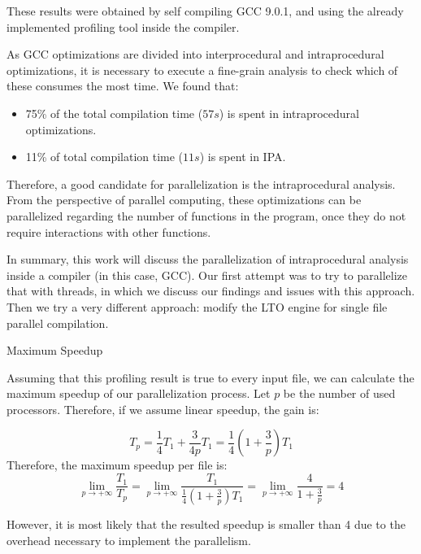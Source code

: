 These results were obtained by self compiling GCC 9.0.1, and using the already
implemented profiling tool inside the compiler.

As GCC optimizations are divided into interprocedural and intraprocedural
optimizations, it is necessary to execute a fine-grain analysis to check which
of these consumes the most time. We found that:
\begin{itemize}
	\item 75\% of the total compilation time ($57s$) is spent in intraprocedural
	optimizations.

	\item 11\% of total compilation time ($11s$) is spent in IPA.
\end{itemize}

Therefore, a good candidate for parallelization is the intraprocedural
analysis. From the perspective of parallel computing, these optimizations can
be parallelized regarding the number of functions in the program, once they do
not require interactions with other functions. 

In summary, this work will discuss the parallelization of intraprocedural
analysis inside a compiler (in this case, GCC). Our first attempt was to try to
parallelize that with threads, in which we discuss our findings and issues with
this approach. Then we try a very different approach: modify the LTO engine for
single file parallel compilation.

\begin{section}{Maximum Speedup}

Assuming that this profiling result is true to every input file, we can calculate the maximum speedup of our parallelization process. Let $p$ be the number of used processors. Therefore, if we assume linear speedup, the gain is:

$$ T_p = \frac{1}{4} T_1 + \frac{3}{4p}T_1 = \frac{1}{4} \left( 1 + \frac{3}{p}
\right)T_1 $$ Therefore, the maximum speedup per file is: $$
\lim_{p \rightarrow +\infty} \frac{T_1}{T_p} = \lim_{p \rightarrow +\infty}
\frac{T_1}{\frac{1}{4} \left( 1 + \frac{3}{p} \right)T_1} = \lim_{p \rightarrow
+\infty} \frac{4}{1 + \frac{3}{p}} = 4$$

However, it is most likely that the resulted speedup is smaller than 4 due to
the overhead necessary to implement the parallelism.

\end{section}

